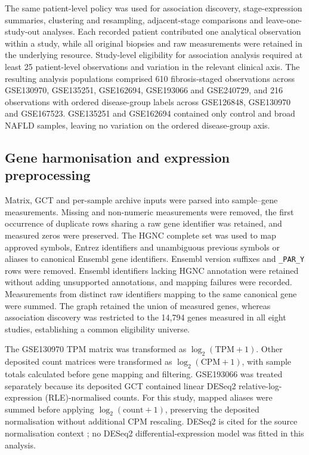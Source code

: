 \documentclass[11pt,a4paper]{article}
\begin{document}
The same patient-level policy was used for association discovery, stage-expression summaries, clustering and resampling, adjacent-stage comparisons and leave-one-study-out analyses. Each recorded patient contributed one analytical observation within a study, while all original biopsies and raw measurements were retained in the underlying resource. Study-level eligibility for association analysis required at least 25 patient-level observations and variation in the relevant clinical axis. The resulting analysis populations comprised 610 fibrosis-staged observations across GSE130970, GSE135251, GSE162694, GSE193066 and GSE240729, and 216 observations with ordered disease-group labels across GSE126848, GSE130970 and GSE167523. GSE135251 and GSE162694 contained only control and broad NAFLD samples, leaving no variation on the ordered disease-group axis.

\subsection*{Gene harmonisation and expression preprocessing}
Matrix, GCT and per-sample archive inputs were parsed into sample--gene measurements. Missing and non-numeric measurements were removed, the first occurrence of duplicate rows sharing a raw gene identifier was retained, and measured zeros were preserved. The HGNC complete set was used to map approved symbols, Entrez identifiers and unambiguous previous symbols or aliases to canonical Ensembl gene identifiers. Ensembl version suffixes and \texttt{\_PAR\_Y} rows were removed. Ensembl identifiers lacking HGNC annotation were retained without adding unsupported annotations, and mapping failures were recorded. Measurements from distinct raw identifiers mapping to the same canonical gene were summed. The graph retained the union of measured genes, whereas association discovery was restricted to the 14,794 genes measured in all eight studies, establishing a common eligibility universe.

The GSE130970 TPM matrix was transformed as \(\log_2(\mathrm{TPM}+1)\). Other deposited count matrices were transformed as \(\log_2(\mathrm{CPM}+1)\), with sample totals calculated before gene mapping and filtering. GSE193066 was treated separately because its deposited GCT contained linear DESeq2 relative-log-expression (RLE)-normalised counts. For this study, mapped aliases were summed before applying \(\log_2(\mathrm{count}+1)\), preserving the deposited normalisation without additional CPM rescaling. DESeq2 is cited for the source normalisation context \cite{ref9}; no DESeq2 differential-expression model was fitted in this analysis.
\end{document}
